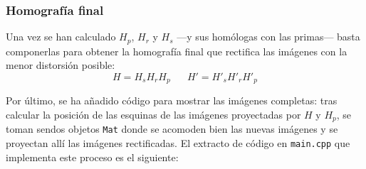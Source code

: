 \documentclass[a4paper, 11pt]{article}
\theoremstyle{definition}
\begin{document}
    \subsubsection{Homografía final}
    Una vez se han calculado $H_p$, $H_r$ y $H_s$ ---y sus homólogas con las primas--- basta componerlas para obtener la homografía final que rectifica las imágenes con la menor distorsión posible:
    \[
    H = H_s H_r H_p\;\;\;\;\;\;
    H' = H'_s H'_r H'_p
    \]

    Por último, se ha añadido código para mostrar las imágenes completas: tras calcular la posición de las esquinas de las imágenes proyectadas por $H$ y $H_p$, se toman sendos objetos \lstinline{Mat} donde se acomoden bien las nuevas imágenes y se proyectan allí las imágenes rectificadas. El extracto de código en \lstinline{main.cpp} que implementa este proceso es el siguiente:
\end{document}
